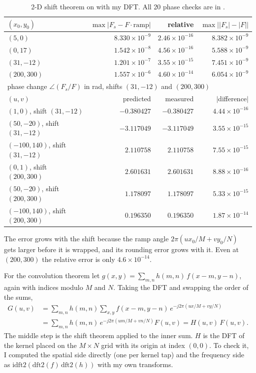 \begin{table}[H]
\centering
\begin{tabular}{lrrr}
\toprule
$(x_0,y_0)$ & $\max|F_s-F\cdot\text{ramp}|$ & relative & $\max\big||F_s|-|F|\big|$\\
\midrule
$(5,0)$ & $8.330\times10^{-9}$ & $2.46\times10^{-16}$ & $8.382\times10^{-9}$\\
$(0,17)$ & $1.542\times10^{-8}$ & $4.56\times10^{-16}$ & $5.588\times10^{-9}$\\
$(31,-12)$ & $1.201\times10^{-7}$ & $3.55\times10^{-15}$ & $7.451\times10^{-9}$\\
$(200,300)$ & $1.557\times10^{-6}$ & $4.60\times10^{-14}$ & $6.054\times10^{-9}$\\
\midrule
\multicolumn{4}{l}{phase change $\angle(F_s/F)$ in rad, shifts $(31,-12)$ and $(200,300)$}\\
\midrule
$(u,v)$ & predicted & measured & $|$difference$|$\\
\midrule
$(1,0)$, shift $(31,-12)$ & $-0.380427$ & $-0.380427$ & $4.44\times10^{-16}$\\
$(50,-20)$, shift $(31,-12)$ & $-3.117049$ & $-3.117049$ & $3.55\times10^{-15}$\\
$(-100,140)$, shift $(31,-12)$ & $2.110758$ & $2.110758$ & $7.55\times10^{-15}$\\
$(0,1)$, shift $(200,300)$ & $2.601631$ & $2.601631$ & $8.88\times10^{-16}$\\
$(50,-20)$, shift $(200,300)$ & $1.178097$ & $1.178097$ & $5.33\times10^{-15}$\\
$(-100,140)$, shift $(200,300)$ & $0.196350$ & $0.196350$ & $1.87\times10^{-14}$\\
\bottomrule
\end{tabular}
\caption{2-D shift theorem on  with my DFT. All 20 phase checks are
in .}
\label{tab:shift}
\end{table}

The error grows with the shift because the ramp angle
$2\pi(ux_0/M+vy_0/N)$ gets larger before it is wrapped, and its rounding error
grows with it. Even at $(200,300)$ the relative error is only
$4.6\times10^{-14}$.

For the convolution theorem let
$g(x,y)=\sum_{m,n}h(m,n)\,f(x-m,y-n)$, again with indices modulo $M$ and $N$.
Taking the DFT and swapping the order of the sums,
\begin{equation}
\begin{aligned}
G(u,v)&=\sum_{m,n}h(m,n)\sum_{x,y}f(x-m,y-n)\,e^{-j2\pi(ux/M+vy/N)}\\
&=\sum_{m,n}h(m,n)\,e^{-j2\pi(um/M+vn/N)}F(u,v)=H(u,v)\,F(u,v).
\end{aligned}
\end{equation}
The middle step is the shift theorem applied to the inner sum. $H$ is the DFT
of the kernel placed on the $M\times N$ grid with its origin at index $(0,0)$.
To check it, I computed the spatial side directly (one  per kernel
tap) and the frequency side as $\text{idft2}(\text{dft2}(f)\,\text{dft2}(h))$
with my own transforms.

